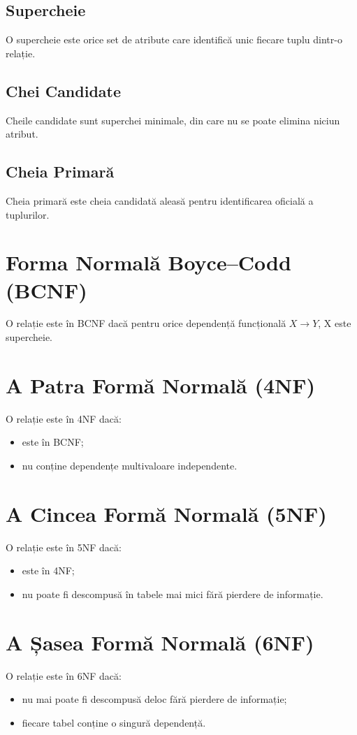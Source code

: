 \documentclass[12pt,a4paper]{article}
\begin{document}
\subsection{Supercheie}
O supercheie este orice set de atribute care identifică unic fiecare tuplu dintr-o relație.

\subsection{Chei Candidate}
Cheile candidate sunt superchei minimale, din care nu se poate elimina niciun atribut.

\subsection{Cheia Primară}
Cheia primară este cheia candidată aleasă pentru identificarea oficială a tuplurilor.

\section{Forma Normală Boyce--Codd (BCNF)}
O relație este în BCNF dacă pentru orice dependență funcțională
\( X \rightarrow Y \), X este supercheie.

\section{A Patra Formă Normală (4NF)}
O relație este în 4NF dacă:
\begin{itemize}[noitemsep]
    \item este în BCNF;
    \item nu conține dependențe multivaloare independente.
\end{itemize}

\section{A Cincea Formă Normală (5NF)}
O relație este în 5NF dacă:
\begin{itemize}[noitemsep]
    \item este în 4NF;
    \item nu poate fi descompusă în tabele mai mici fără pierdere de informație.
\end{itemize}

\section{A Șasea Formă Normală (6NF)}
O relație este în 6NF dacă:
\begin{itemize}[noitemsep]
    \item nu mai poate fi descompusă deloc fără pierdere de informație;
    \item fiecare tabel conține o singură dependență.
\end{itemize}
\end{document}

